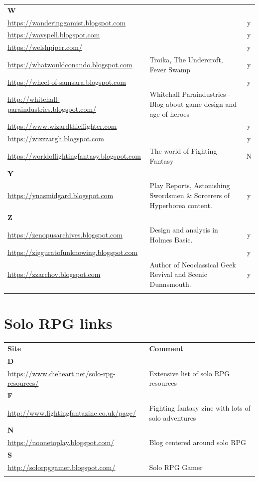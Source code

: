 \documentclass[a4paper, 11pt, twoside]{article}
\begin{document}
\begin{longtable}{p{6cm}p{8cm}c}
\textbf{W} &  & \\
\url{https://wanderinggamist.blogspot.com} &  & y\\
\url{https://wayspell.blogspot.com} &  & y\\
\url{https://welshpiper.com/} &  & y\\
\url{https://whatwouldconando.blogspot.com} & Troika, The Undercroft, Fever Swamp & y\\
\url{https://wheel-of-samsara.blogspot.com} &  & y\\
\url{http://whitehall-paraindustries.blogspot.com/} & Whitehall Paraindustries - Blog about game design and age of heroes & \\
\url{https://www.wizardthieffighter.com} &  & y\\
\url{https://wizzzargh.blogspot.com} &  & y\\
\url{https://worldoffightingfantasy.blogspot.com} & The world of Fighting Fantasy & N\\
\textbf{Y} &  & \\
\url{https://ynasmidgard.blogspot.com} & Play Reports, Astonishing Swordsmen \& Sorcerers of Hyperborea content. & y\\
\textbf{Z} &  & \\
\url{https://zenopusarchives.blogspot.com} & Design and analysis in Holmes Basic. & y\\
\url{https://zigguratofunknowing.blogspot.com} &  & y\\
\url{https://zzarchov.blogspot.com} & Author of Neoclassical Geek Revival and Scenic Dunnsmouth. & y\\
 &  & \\
\end{longtable}

\section{Solo RPG links}
\label{sec:org2849901}

\begin{longtable}{p{6cm}p{8cm}}
\textbf{Site} & \textbf{Comment}\\
\textbf{D} & \\
\url{https://www.dieheart.net/solo-rpg-resources/} & Extensive list of solo RPG resources\\
\textbf{F} & \\
\url{http://www.fightingfantazine.co.uk/page/} & Fighting fantasy zine with lots of solo adventures\\
\textbf{N} & \\
\url{https://noonetoplay.blogspot.com/} & Blog centered around solo RPG\\
\textbf{S} & \\
\url{http://solorpggamer.blogspot.com/} & Solo RPG Gamer\\
 & \\
\end{longtable}
\end{document}
